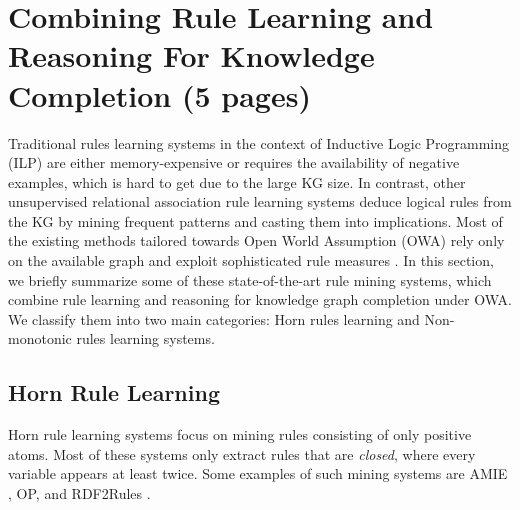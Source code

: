 \section{Combining Rule Learning and Reasoning For Knowledge Completion (5 pages)}
\label{sec:rules_kg_completion}
Traditional rules learning systems in the context of Inductive Logic Programming (ILP) \cite{probfoil,DBLP:conf/ijcai/RaedtDTBV15,DBLP:conf/clima/CorapiSIR11} are either memory-expensive or requires the availability of negative examples, which is hard to get due to the large KG size. In contrast, other unsupervised relational 
association rule learning systems deduce logical rules from the KG by mining frequent patterns and casting them into implications. Most of the  existing methods tailored towards Open World Assumption (OWA) rely only on the available graph and exploit sophisticated rule measures \cite{amie,op,rumis}.
In this section, we briefly summarize some of these state-of-the-art rule mining systems, which combine rule learning and reasoning for knowledge graph completion under OWA. We classify them into two main categories: Horn rules learning and Non-monotonic rules learning systems.
\subsection{Horn Rule Learning}
Horn rule learning systems focus on mining rules consisting of only positive atoms. Most of these systems only extract rules that are \emph{closed}, where every variable appears at least twice. Some examples of such mining systems are AMIE \cite{amie}, OP, \cite{op} and RDF2Rules \cite{rdf2rules}.

